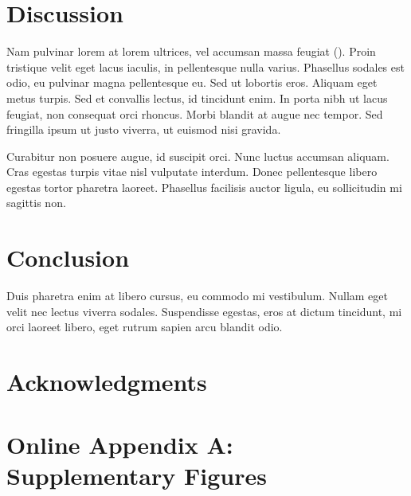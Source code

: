\documentclass[11pt]{article}
\begin{document}

\section*{Discussion}

Nam pulvinar lorem at lorem ultrices, vel accumsan massa feugiat 
(\citealt{Ing11}). Proin tristique velit eget lacus iaculis, in 
pellentesque nulla varius. Phasellus sodales est odio, eu pulvinar 
magna pellentesque eu. Sed ut lobortis eros. Aliquam eget metus turpis. 
Sed et convallis lectus, id tincidunt enim. In porta nibh ut lacus 
feugiat, non consequat orci rhoncus. Morbi blandit at augue nec tempor. 
Sed fringilla ipsum ut justo viverra, ut euismod nisi gravida.

Curabitur non posuere augue, id suscipit orci. Nunc luctus accumsan 
aliquam. Cras egestas turpis vitae nisl vulputate interdum. Donec 
pellentesque libero egestas tortor pharetra laoreet. Phasellus facilisis 
auctor ligula, eu sollicitudin mi sagittis non.

\section*{Conclusion}

Duis pharetra enim at libero cursus, eu commodo mi vestibulum. Nullam 
eget velit nec lectus viverra sodales. Suspendisse egestas, eros at 
dictum tincidunt, mi orci laoreet libero, eget rutrum sapien arcu 
blandit odio.


\section*{Acknowledgments}


\newpage{}

\renewcommand{\thesection}{\Alph{section}}

\section*{Online Appendix A: Supplementary Figures}
\end{document}
